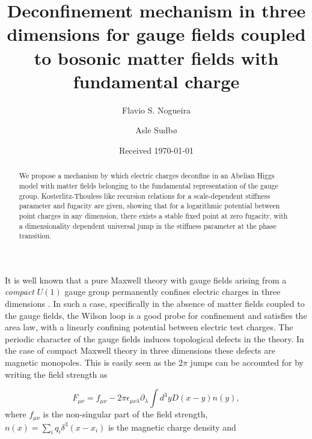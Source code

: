 \documentclass[a4paper,showpacs,preprintnumbers,amsmath,amssymb,prl,twocolumn]{revtex4}
\begin{document}
\title{Deconfinement mechanism in three dimensions 
for gauge fields coupled to bosonic matter fields with fundamental 
charge}
\author{Flavio S. Nogueira}
\author{Asle Sudb{\o}}
\date{Received \today}

\begin{abstract}
We propose a mechanism by which electric charges deconfine 
in an Abelian Higgs model with matter fields belonging to 
the fundamental representation of the gauge group. 
Kosterlitz-Thouless like recursion relations for a
scale-dependent stiffness parameter and fugacity are given,
showing that for a logarithmic potential between point 
charges in any dimension, there exists a stable fixed point 
at zero fugacity, with a dimensionality dependent universal 
jump in the stiffness parameter at the phase transition. 
\end{abstract}

\maketitle


It is well known that a pure Maxwell theory with gauge fields arising 
from a {\it compact} $U(1)$ gauge group permanently confines 
electric charges in three dimensions \cite{Polyakov}. In such a case,
specifically in the absence of matter fields coupled to the gauge fields,  
the Wilson loop is a good probe for confinement and satisfies 
the area law, with a linearly confining potential between electric 
test charges. The periodic character of the gauge fields induces 
topological defects in the theory. In the case of compact Maxwell theory 
in three dimensions these defects are magnetic monopoles. This is easily 
seen as the $2\pi$ jumps can be accounted for by writing the field strength 
as

\begin{equation}
\label{F}
F_{\mu\nu}=f_{\mu\nu}-2\pi\epsilon_{\mu\nu\lambda}
\partial_\lambda\int d^3y D(x-y)n(y),
\end{equation}
where $f_{\mu\nu}$ is the non-singular part of the field strength, 
$n(x)=\sum_i q_i\delta^3(x-x_i)$ is the magnetic charge density and 
\end{document}

